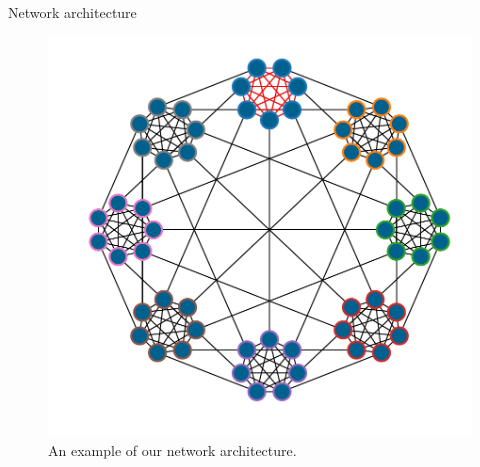 \documentclass[final,hyperref={pdfpagelabels=false}]{beamer}
\begin{document}
\begin{frame}
\begin{columns}
\begin{column}{.30\textwidth}
\begin{minipage}[T]{.95\textwidth}
{\begin{block}{Network architecture}
							\begin{figure}
								\includegraphics[width=.8\linewidth]{network2.pdf}
								\caption{An example of our network architecture.}
								\label{fig:network}
							\end{figure}
						\end{block}		
										
}
\end{minipage}
\end{column}
\end{columns}
\end{frame}
\end{document}
